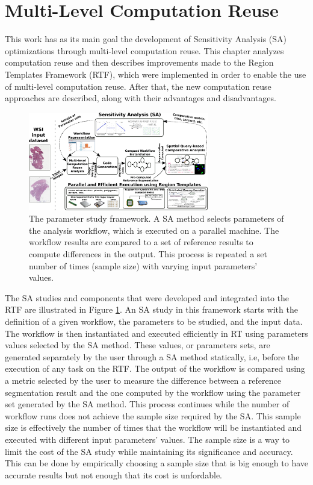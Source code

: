 \section{Multi-Level Computation Reuse}

This work has as its main goal the development of Sensitivity Analysis (SA) optimizations through multi-level computation reuse. This chapter analyzes computation reuse and then describes improvements made to the Region Templates Framework (RTF), which were implemented in order to enable the use of multi-level computation reuse. After that, the new computation reuse approaches are described, along with their advantages and disadvantages.

\begin{figure}[t]
\begin{center}
\includegraphics[width=0.7\textwidth]{img/functions.png} \caption{The parameter study framework. A SA method selects parameters of the analysis workflow, which is executed on a parallel machine. The workflow results are compared to a set of reference results to compute differences in the output. This process is repeated a set number of times (sample size) with varying input parameters' values.}
\label{fig:overview}
\end{center}
\vspace{-4mm}
\end{figure}

The SA studies and components that were developed and integrated into the RTF are illustrated in Figure \ref{fig:overview}. An SA study in this framework starts with the definition of a given workflow, the parameters to be studied, and the input data. The workflow is then instantiated and executed efficiently in RT using parameters values selected by the SA method. These values, or parameters sets, are generated separately by the user through a SA method statically, i.e, before the execution of any task on the RTF. The output of the workflow is compared using a metric selected by the user to measure the difference between a reference segmentation result and the one computed by the workflow using the parameter set generated by the SA method. This process continues while the number of workflow runs does not achieve the sample size required by the SA. This sample size is effectively the number of times that the workflow will be instantiated and executed with different input parameters' values. The sample size is a way to limit the cost of the SA study while maintaining its significance and accuracy. This can be done by empirically choosing a sample size that is big enough to have accurate results but not enough that its cost is unfordable.

